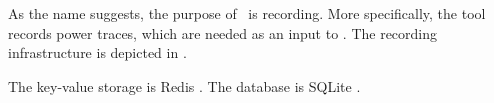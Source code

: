 
As the name suggests, the purpose of \recorder\ is recording. More specifically,
the tool records power traces, which are needed as an input to \streamer. The
recording infrastructure is depicted in .

The key-value storage is Redis \cite{redis}. The database is SQLite
\cite{sqlite}.

